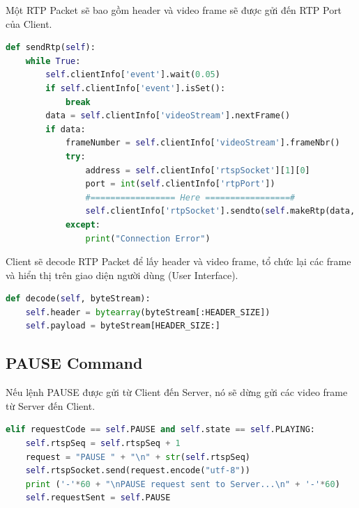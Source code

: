 \documentclass[a4paper]{article}
\begin{document}
\noindent Một RTP Packet sẽ bao gồm header và video frame sẽ được gửi đến RTP Port của Client.

\begin{lstlisting}[language=Python]
def sendRtp(self):
    while True:
        self.clientInfo['event'].wait(0.05) 
        if self.clientInfo['event'].isSet(): 
            break 
        data = self.clientInfo['videoStream'].nextFrame()
        if data: 
            frameNumber = self.clientInfo['videoStream'].frameNbr()
            try:
                address = self.clientInfo['rtspSocket'][1][0]
                port = int(self.clientInfo['rtpPort'])
                #================= Here =================#
                self.clientInfo['rtpSocket'].sendto(self.makeRtp(data, frameNumber),(address,port))
            except:
                print("Connection Error")
\end{lstlisting}

Client sẽ decode RTP Packet để lấy header và video frame, tổ chức lại các frame và hiển thị trên giao diện người dùng (User Interface).

\begin{lstlisting}[language=Python]
def decode(self, byteStream):
    self.header = bytearray(byteStream[:HEADER_SIZE])
    self.payload = byteStream[HEADER_SIZE:]
\end{lstlisting}

\subsection{PAUSE Command}

\noindent Nếu lệnh PAUSE được gửi từ Client đến Server, nó sẽ dừng gửi các video frame từ Server đến Client.

\begin{lstlisting}[language=Python]
elif requestCode == self.PAUSE and self.state == self.PLAYING:
    self.rtspSeq = self.rtspSeq + 1
    request = "PAUSE " + "\n" + str(self.rtspSeq)
    self.rtspSocket.send(request.encode("utf-8"))
    print ('-'*60 + "\nPAUSE request sent to Server...\n" + '-'*60)
    self.requestSent = self.PAUSE
\end{lstlisting}
\\
\end{document}
